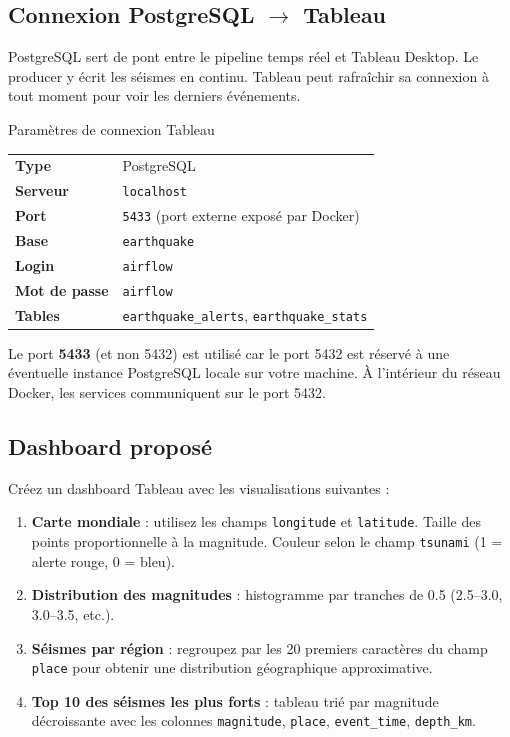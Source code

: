 \documentclass[12pt,a4paper]{article}
\begin{document}
\subsection{Connexion PostgreSQL $\to$ Tableau}

PostgreSQL sert de pont entre le pipeline temps réel et Tableau Desktop.
Le producer y écrit les séismes en continu. Tableau peut rafraîchir sa connexion
à tout moment pour voir les derniers événements.

\begin{infobox}{Paramètres de connexion Tableau}
  \begin{tabular}{ll}
    \textbf{Type}     & PostgreSQL \\
    \textbf{Serveur}  & \texttt{localhost} \\
    \textbf{Port}     & \texttt{5433} (port externe exposé par Docker) \\
    \textbf{Base}     & \texttt{earthquake} \\
    \textbf{Login}    & \texttt{airflow} \\
    \textbf{Mot de passe} & \texttt{airflow} \\
    \textbf{Tables}   & \texttt{earthquake\_alerts}, \texttt{earthquake\_stats} \\
  \end{tabular}
\end{infobox}

\begin{warningbox}
  Le port \textbf{5433} (et non 5432) est utilisé car le port 5432 est réservé
  à une éventuelle instance PostgreSQL locale sur votre machine.
  À l'intérieur du réseau Docker, les services communiquent sur le port 5432.
\end{warningbox}

\subsection{Dashboard proposé}

Créez un dashboard Tableau avec les visualisations suivantes :

\begin{enumerate}
  \item \textbf{Carte mondiale} : utilisez les champs \texttt{longitude} et \texttt{latitude}.
        Taille des points proportionnelle à la magnitude.
        Couleur selon le champ \texttt{tsunami} (1 = alerte rouge, 0 = bleu).

  \item \textbf{Distribution des magnitudes} : histogramme par tranches de 0.5
        (2.5--3.0, 3.0--3.5, etc.).

  \item \textbf{Séismes par région} : regroupez par les 20 premiers caractères
        du champ \texttt{place} pour obtenir une distribution géographique approximative.

  \item \textbf{Top 10 des séismes les plus forts} : tableau trié par magnitude décroissante
        avec les colonnes \texttt{magnitude}, \texttt{place}, \texttt{event\_time}, \texttt{depth\_km}.
\end{enumerate}
\end{document}
